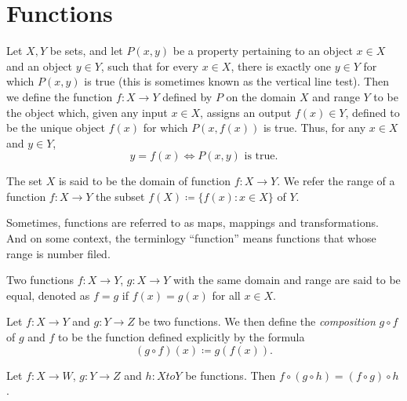 \section{Functions}
\begin{defn}[Function]
Let $X, Y$ be sets, and let $P(x, y)$ be a property pertaining to an object 
$x \in X$ and an object $y \in Y$, such that for every $x \in X$, there is 
exactly one $y \in Y$ for which $P(x, y)$ is true (this is sometimes known as 
the vertical line test). 
Then we define the function $f : X \to Y$ defined by $P$ on the domain $X$ 
and range $Y$ to be the object which, given any input $x \in X$, assigns an 
output $f(x) \in Y$, defined to be the unique object $f(x)$ for which 
$P(x, f(x))$ is true. 
Thus, for any $x ∈ X$ and $y ∈ Y$,
\begin{equation*}
    y = f(x) \iff P(x, y) \text{ is true}.
\end{equation*}

The set $X$ is said to be the domain of function $f: X \to Y$. 
We refer the range of a function $f: X \to Y$ the subset $f(X) \coloneqq 
\{f(x): x \in X\}$ of $Y$. 
\end{defn}


\begin{rmk}
Sometimes, functions are referred to as maps, mappings and transformations. 
And on some context, the terminlogy ``function'' means functions that whose 
range is number filed. 
\end{rmk} 

\begin{defn}
Two functions $f: X \to Y$, $g: X \to Y$ with the same domain and range are 
said to be equal, denoted as $f = g$ if $f(x) = g(x)$ for all $x \in X$. 
\end{defn}

\begin{defn}[Composition]
Let $f: X \to Y$ and $g: Y \to Z$ be two functions. 
We then define the \emph{composition} $g \circ f$ of $g$ and $f$ to be the 
function defined explicitly by the formula 
\begin{equation*}
    (g \circ f)(x) \coloneqq g(f(x)). 
\end{equation*}
\end{defn}

\begin{prop}
Let $f: X \to W$, $g: Y \to Z$ and $h: X to Y$ be functions. 
Then $f \circ (g \circ h) = (f \circ g) \circ h$. 
\end{prop}

